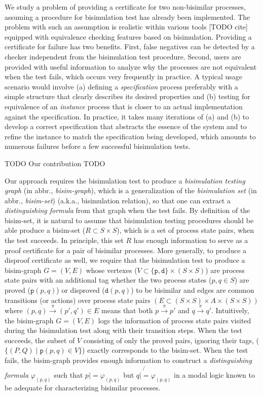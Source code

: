 \documentclass{llncs}
\begin{document}
We study a problem of providing a certificate for two non-bisimilar processes,
assuming a procedure for bisimulation test has already been implemented.
The problem with such an assumption is realistic within various tools [TODO cite]
equipped with equivalence checking features based on bisimulation.
Providing a certificate for failure has two benefits. First, false negatives
can be detected by a checker independent from the bisimulation test procedure.
Second, users are provided with useful information to analyze why
the processes are not equivalent when the test fails, which occurs very
frequently in practice. A typical usage scenario would involve
(a) defining a \emph{specification} process preferably with a simple structure
    that clearly describes its desired properties and
(b) testing for equivalence of an \emph{instance} process that is closer to
    an actual implementation against the specification.
In practice, it takes many iterations of (a) and (b) to develop a correct
specification that abstracts the essence of the system and to refine
the instance to match the specification being developed, which amounts to
numerous failures before a few successful bisimulation tests.

TODO Our contribution TODO

Our approach requires the bisimulation test to produce
a \emph{bisimulation testing graph} (in abbr., \emph{bisim-graph}),
which is a generalization of the \emph{bisimulation set}
(in abbr., \emph{bisim-set}) (a.k.a., bisimulation relation),
so that one can extract a \emph{distinguishing formula} from that graph
when the test fails.
By definition of the bisim-set, it is natural to assume that bisimulation
testing procedures should be able produce a bisim-set ($R \subset S\times S$),
which is a set of process state pairs, when the test succeeds.
In principle, this set $R$ has enough information to serve as a proof
certificate for a pair of bisimilar processes. More generally, to produce
a disproof certificate as well, we require that the bisimulation test
to produce a bisim-graph $G=(V,E)$ whose vertexes
($V\subset\{\texttt{p},\texttt{d}\}\times(S\times S)$) are process state pairs
with an additional tag whether the two process states ($p, q\in S$) are proved
($\texttt{p}(p,q)$) or disproved ($\texttt{d}(p,q)$) to be bisimilar and edges
are common transitions (or actions) over process state pairs
$(E\subset(S\times S)\times A\times(S\times S))$ where
$(p,q)\xrightarrow{\pi}(p',q') \in E$ means that both $p\xrightarrow{\pi}p'$
and $q\xrightarrow{\pi}q'$. Intuitively, the bisim-graph $G=(V,E)$ logs
the information of process state pairs visited during the bisimulation test
along with their transition steps. When the test succeeds,
the subset of $V$ consisting of only the proved pairs, ignoring their tags,
($\{(P,Q) \mid \texttt{p}(p,q)\in V\}$) exactly corresponds to the bisim-set.
When the test fails, the bisim-graph provides enough information to
construct a \emph{distinguishing formula} $\varphi_{(p,q)}$ such that
$p |= \varphi_{(p,q)}$ but $q \not{|=} \varphi_{(p,q)}$ in a modal logic
known to be adequate for characterizing bisimilar processes.
\end{document}
